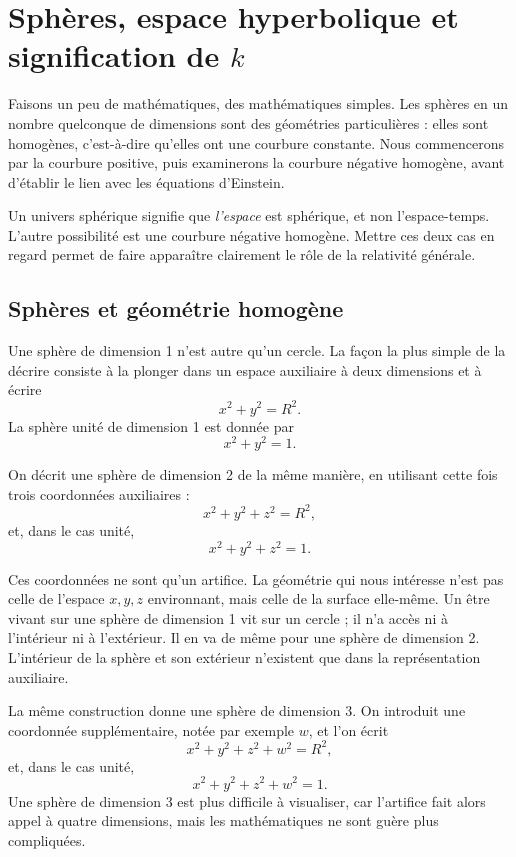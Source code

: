 \chapter{Sphères, espace hyperbolique et signification de \(k\)}

Faisons un peu de mathématiques, des mathématiques simples. Les sphères en un nombre quelconque de dimensions sont des géométries particulières : elles sont homogènes, c’est-à-dire qu’elles ont une courbure constante. Nous commencerons par la courbure positive, puis examinerons la courbure négative homogène, avant d’établir le lien avec les équations d’Einstein.

Un univers sphérique signifie que \emph{l’espace} est sphérique, et non l’espace-temps. L’autre possibilité est une courbure négative homogène. Mettre ces deux cas en regard permet de faire apparaître clairement le rôle de la relativité générale.

\section{Sphères et géométrie homogène}

Une sphère de dimension 1 n’est autre qu’un cercle. La façon la plus simple de la décrire consiste à la plonger dans un espace auxiliaire à deux dimensions et à écrire
\begin{equation}
x^2+y^2=R^2.
\end{equation}
La sphère unité de dimension 1 est donnée par
\begin{equation}
x^2+y^2=1.
\end{equation}

On décrit une sphère de dimension 2 de la même manière, en utilisant cette fois trois coordonnées auxiliaires :
\begin{equation}
x^2+y^2+z^2=R^2,
\end{equation}
et, dans le cas unité,
\begin{equation}
x^2+y^2+z^2=1.
\end{equation}

Ces coordonnées ne sont qu’un artifice. La géométrie qui nous intéresse n’est pas celle de l’espace \(x,y,z\) environnant, mais celle de la surface elle-même. Un être vivant sur une sphère de dimension 1 vit sur un cercle ; il n’a accès ni à l’intérieur ni à l’extérieur. Il en va de même pour une sphère de dimension 2. L’intérieur de la sphère et son extérieur n’existent que dans la représentation auxiliaire.

La même construction donne une sphère de dimension 3. On introduit une coordonnée supplémentaire, notée par exemple \(w\), et l’on écrit
\begin{equation}
x^2+y^2+z^2+w^2=R^2,
\end{equation}
et, dans le cas unité,
\begin{equation}
x^2+y^2+z^2+w^2=1.
\end{equation}
Une sphère de dimension 3 est plus difficile à visualiser, car l’artifice fait alors appel à quatre dimensions, mais les mathématiques ne sont guère plus compliquées.

